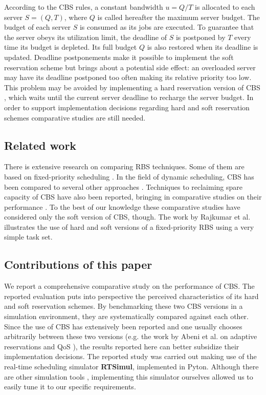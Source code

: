 \documentclass[12pt]{article}
\newcommand{\simul}{\textbf{RTSimul}} %
\begin{document}
According to the CBS rules, a constant bandwidth $u = Q/T$ is
allocated to each server $S = (Q,T)$, where $Q$ is called hereafter
the maximum server budget. The budget of each server $S$ is consumed
as its jobs are executed. To guarantee that the server obeys its
utilization limit, the deadline of $S$ is postponed by $T$ every time
its budget is depleted.  Its full budget $Q$ is also restored when its
deadline is updated.  Deadline postponements make it possible to
implement the soft reservation scheme but brings about a potential
side effect: an overloaded server may have its deadline postponed too
often making its relative priority too low.  This problem may be
avoided by implementing a hard reservation version of CBS
\cite{buttazzo05:soft}, which waits until the current server deadline
to recharge the server budget. In order to support implementation
decisions regarding hard and soft reservation schemes comparative
studies are still needed.

\subsection{Related work}
\label{sec:related-work}

There is extensive research on comparing RBS
techniques.  Some of them are based on fixed-priority scheduling
\cite{bernat.ea99:new,bernat.ea02:multiple,davis.ea05:hierarchical,davis.ea95:dual}.
In the field of dynamic scheduling, CBS has been compared to several
other approaches \cite{spuri.ea96:scheduling}.  Techniques to
reclaiming spare capacity of CBS have also been reported, bringing in
comparative studies on their performance
\cite{caccamo.ea00:capacity,lin.ea05:improving}. To the best of our
knowledge these comparative studies have considered only the soft
version of CBS, though.  The work by Rajkumar et
al. \cite{rajkumar.ea01:resource} illustrates the use of hard and soft
versions of a fixed-priority RBS using a very simple task set.

\subsection{Contributions of this paper}
\label{sec:contr-this-paper}

We report a comprehensive comparative study on the performance of
CBS. The reported evaluation puts into perspective the perceived
characteristics of its hard and soft reservation schemes.  By
benchmarking these two CBS versions in a simulation environment, they
are systematically compared against each other.  Since the use of CBS
has extensively been reported and one usually chooses arbitrarily
between these two versions (e.g. the work by Abeni et al. on adaptive
reservations and QoS \cite{abeni.ea99:adaptive,abeni.ea05:qos}), the
results reported here can better subsidize their implementation
decisions.  The reported study was carried out making use of the
real-time scheduling simulator \simul{}, implemented in
Pyton. Although there are other simulation tools
\cite{ancilotti.ea96:flexible}, implementing this simulator ourselves
allowed us to easily tune it to our specific requirements.
\end{document}
